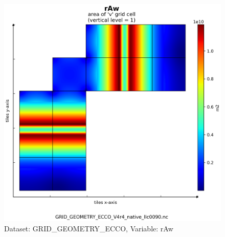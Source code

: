\begin{figure}[H]
\centering
\includegraphics[scale=0.55]{../images/plots/v4r4/native_plots_coords/Geometry_Parameters_for_the_Lat-Lon-Cap_90_(llc90)_Native_Model_Grid_(Version_4_Release_4)/rAw.png}
\caption{Dataset: GRID\_GEOMETRY\_ECCO, Variable: rAw}
\label{tab:table-GRID_GEOMETRY_ECCO_rAw-Plot}
\end{figure}
\newpage
\pagebreak
